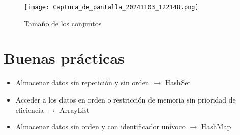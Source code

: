 \documentclass{article}
\begin{document}
\begin{figure}[h]
    \centering
    \texttt{[image: Captura\_de\_pantalla\_20241103\_122148.png]}
    \caption{Tamaño de los conjuntos}
    \label{fig:etiqueta}
\end{figure}


\section{Buenas prácticas}
\begin{itemize}
    \item Almacenar datos sin repetición y sin orden $\xrightarrow{}$ HashSet
    \item Acceder a los datos en orden o restricción de memoria sin prioridad de eficiencia $\xrightarrow{}$ ArrayList
    \item Almacenar datos sin orden y con identificador unívoco $\xrightarrow{}$ HashMap
    
\end{itemize}
\end{document}
